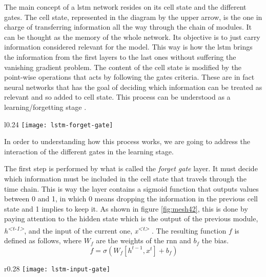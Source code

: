 	The main concept of a \acrshort{lstm} network resides on its cell state and the different gates. The cell state, represented in the diagram by the upper arrow, is the one in charge of transferring information all the way through the chain of modules. It can be thought as the memory of the whole network. Its objective is to just carry information considered relevant for the model. This way is how the \acrshort{lstm} brings the information from the first layers to the last ones without suffering the vanishing gradient problem. The content of the cell state is modified by the point-wise operations that acts by following the gates criteria. These are in fact neural networks that has the goal of deciding which information can be treated as relevant and so added to cell state. This process can be understood as a learning/forgetting stage \cite{Nguyen2018}. 
	
	\begin{wrapfigure}[8]{l}{0.24\textwidth}
		\centering
		\captionsetup{justification=centering}
		\texttt{[image: lstm-forget-gate]}
		\caption{Forget gate}
		\label{fig:mesh42}
	\end{wrapfigure}

	In order to understanding how this process works, we are going to address the interaction of the different gates in the learning stage.

	The first step is performed by what is called the \textit{forget gate} layer. It must decide which information must be included in the cell state that travels through the time chain. This is way the layer contains a sigmoid function that outputs values between  0 and 1, in which  0 means dropping the information in the previous cell state and 1 implies to keep it. As shown in figure \ref{fig:mesh42}, this is done by paying attention to the hidden state which is the output of the previous module, \textit{h\textsuperscript{<t-1>}}, and the input of the current one, \textit{x\textsuperscript{<t>}} \cite{Nguyen2018}. The resulting function $f$ is defined as follows, where $W_{f}$ are the weights of the \acrshort{rnn} and $b_{f}$ the bias.
	\[
	\ f = \sigma(W_{f}[h^{t-1}, x^{t}] + b_{f})
	\]
	
	\begin{wrapfigure}{r}{0.28\textwidth}
		\centering
		\captionsetup{justification=centering}
		\texttt{[image: lstm-input-gate]}
		\caption{Input gate}
		\label{fig:mesh43}
	\end{wrapfigure}
	
